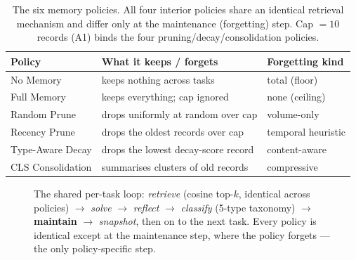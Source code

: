 \begin{table}[htbp]
  \centering
  \caption{The six memory policies. All four interior policies share an identical
  retrieval mechanism and differ only at the maintenance (forgetting) step. Cap $=10$
  records (A1) binds the four pruning/decay/consolidation policies.}
  \label{tab:policies}
  \begin{tabular}{lll}
    \toprule
    Policy & What it keeps / forgets & Forgetting kind \\
    \midrule
    No Memory          & keeps nothing across tasks            & total (floor) \\
    Full Memory        & keeps everything; cap ignored         & none (ceiling) \\
    Random Prune       & drops uniformly at random over cap    & volume-only \\
    Recency Prune      & drops the oldest records over cap      & temporal heuristic \\
    Type-Aware Decay   & drops the lowest decay-score record   & content-aware \\
    CLS Consolidation  & summarises clusters of old records    & compressive \\
    \bottomrule
  \end{tabular}
\end{table}

\begin{figure}[htbp]
\centering
{}
\caption{The shared per-task loop: \emph{retrieve} (cosine top-$k$, identical across
policies) $\rightarrow$ \emph{solve} $\rightarrow$ \emph{reflect} $\rightarrow$
\emph{classify} (5-type taxonomy) $\rightarrow$ \textbf{maintain} $\rightarrow$
\emph{snapshot}, then on to the next task. Every policy is identical except at the
maintenance step, where the policy forgets --- the only policy-specific step.}
\label{fig:task-lifecycle}
\end{figure}
